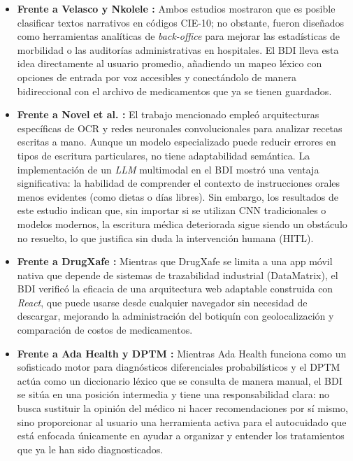 \begin{itemize}
    \item \textbf{Frente a Velasco \cite{Velasco} y Nkolele \cite{nkolele}:} Ambos estudios mostraron que es posible clasificar textos narrativos en códigos {CIE-10}; no obstante, fueron diseñados como herramientas analíticas de \emph{back-office} para mejorar las estadísticas de morbilidad o las auditorías administrativas en hospitales. El {BDI} lleva esta idea directamente al usuario promedio, añadiendo un mapeo léxico con opciones de entrada por voz accesibles y conectándolo de manera bidireccional con el archivo de medicamentos que ya se tienen guardados.
    
    \item \textbf{Frente a Novel et al. \cite{novel}:} El trabajo mencionado empleó arquitecturas específicas de {OCR} y redes neuronales convolucionales para analizar recetas escritas a mano. Aunque un modelo especializado puede reducir errores en tipos de escritura particulares, no tiene adaptabilidad semántica. La implementación de un \emph{LLM} multimodal en el {BDI} mostró una ventaja significativa: la habilidad de comprender el contexto de instrucciones orales menos evidentes (como dietas o días libres). Sin embargo, los resultados de este estudio indican que, sin importar si se utilizan {CNN} tradicionales o modelos modernos, la escritura médica deteriorada sigue siendo un obstáculo no resuelto, lo que justifica sin duda la intervención humana ({HITL}).
    
    \item \textbf{Frente a DrugXafe \cite{DrugXafe}:} Mientras que DrugXafe se limita a una app móvil nativa que depende de sistemas de trazabilidad industrial ({DataMatrix}), el {BDI} verificó la eficacia de una arquitectura web adaptable construida con \emph{React}, que puede usarse desde cualquier navegador sin necesidad de descargar, mejorando la administración del botiquín con geolocalización y comparación de costos de medicamentos.
    
    \item \textbf{Frente a Ada Health \cite{AdaHealthApp} y DPTM \cite{DPTM}:} Mientras Ada Health funciona como un sofisticado motor para diagnósticos diferenciales probabilísticos y el {DPTM} actúa como un diccionario léxico que se consulta de manera manual, el {BDI} se sitúa en una posición intermedia y tiene una responsabilidad clara: no busca sustituir la opinión del médico ni hacer recomendaciones por sí mismo, sino proporcionar al usuario una herramienta activa para el autocuidado que está enfocada únicamente en ayudar a organizar y entender los tratamientos que ya le han sido diagnosticados.
\end{itemize}


